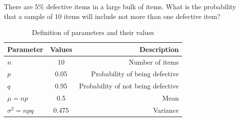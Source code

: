 \documentclass[]{article}
\begin{document}
\providecommand{\qfunc}[1]{\ensuremath{Q\left(#1\right)}}
\providecommand{\gauss}[2]{\mathcal{N}\ensuremath{\left(#1,#2\right)}}
\providecommand{\diff}[2]{\ensuremath{\frac{d{#1}}{d{#2}}}}
\providecommand{\myceil}[1]{\left \lceil #1 \right \rceil }
\newcommand\figref{Fig.~\ref}
\newcommand\tabref{Table~\ref}
\newcommand{\sinc}{\,\text{sinc}\,}
\newcommand{\rect}{\,\text{rect}\,}

\let\vec\mathbf

There are 5\% defective items in a large bulk of items. What is the probability 
that a sample of 10 items will include not more than one defective item?
\solution
\fi
\begin{table}[!ht]
\centering
\begin{tabular}{|l|c|r|}
    \hline
    Parameter & Values & Description\\
    \hline
    $n$ & 10 & Number of items\\
    \hline
    $p$ & 0.05 & Probability of being defective\\
    \hline
    $q$ & 0.95 & Probability of not being defective\\
    \hline
    $\mu = np$ & 0.5 & Mean\\
    \hline
    ${\sigma}^2 = npq$ & 0.475 & Variance\\
    \hline
\end{tabular}
\caption{Definition of parameters and their values}
\label{tab:gaussian/9/3/7}
\end{table}
\end{document}
